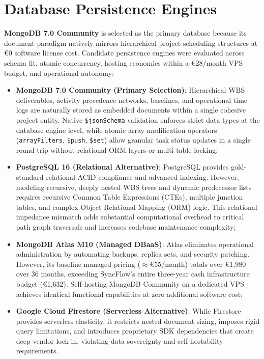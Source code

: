 \newpage

\section{Database Persistence Engines}
\textbf{MongoDB 7.0 Community} is selected as the primary database because its document paradigm natively mirrors hierarchical project scheduling structures at €0 software license cost. Candidate persistence engines were evaluated across schema fit, atomic concurrency, hosting economics within a €28/month VPS budget, and operational autonomy:
\begin{itemize}[itemsep=1pt,topsep=1.5pt]
    \item \textbf{MongoDB 7.0 Community (Primary Selection)}: Hierarchical WBS deliverables, activity precedence networks, baselines, and operational time logs are naturally stored as embedded documents within a single cohesive project entity. Native \texttt{\$jsonSchema} validation enforces strict data types at the database engine level, while atomic array modification operators (\texttt{arrayFilters}, \texttt{\$push}, \texttt{\$set}) allow granular task status updates in a single round-trip without relational ORM layers or multi-table locking;
    \item \textbf{PostgreSQL 16 (Relational Alternative)}: PostgreSQL provides gold-standard relational ACID compliance and advanced indexing. However, modeling recursive, deeply nested WBS trees and dynamic predecessor lists requires recursive Common Table Expressions (CTEs), multiple junction tables, and complex Object-Relational Mapping (ORM) logic. This relational impedance mismatch adds substantial computational overhead to critical path graph traversals and increases codebase maintenance complexity;
    \item \textbf{MongoDB Atlas M10 (Managed DBaaS)}: Atlas eliminates operational administration by automating backups, replica sets, and security patching. However, its baseline managed pricing ($\approx$€55/month) totals over €1,980 over 36 months, exceeding SyncFlow's entire three-year cash infrastructure budget (€1,632). Self-hosting MongoDB Community on a dedicated VPS achieves identical functional capabilities at zero additional software cost;
    \item \textbf{Google Cloud Firestore (Serverless Alternative)}: While Firestore provides serverless elasticity, it restricts nested document sizing, imposes rigid query limitations, and introduces proprietary SDK dependencies that create deep vendor lock-in, violating data sovereignty and self-hostability requirements.
\end{itemize}

